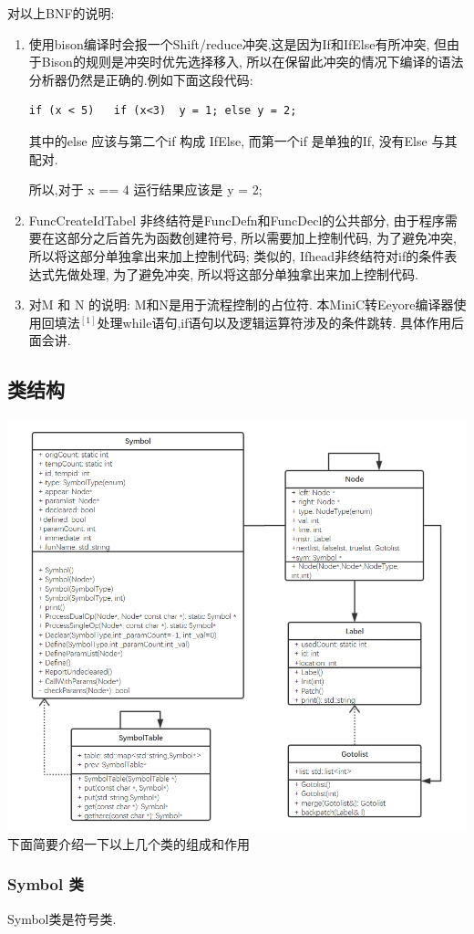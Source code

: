 \documentclass[UTF8]{article}
\begin{document}
对以上BNF的说明:
\begin{enumerate}[(1)]
\item 使用bison编译时会报一个Shift/reduce冲突,这是因为If和IfElse有所冲突, 但由于Bison的规则是冲突时优先选择移入, 所以在保留此冲突的情况下编译的语法分析器仍然是正确的.例如下面这段代码:
\begin{lstlisting}
if (x < 5)   if (x<3)  y = 1; else y = 2; 
\end{lstlisting}
其中的else 应该与第二个if 构成 IfElse, 而第一个if 是单独的If, 没有Else 与其配对.

所以,对于 x == 4 运行结果应该是 y = 2;
\item FuncCreateIdTabel 非终结符是FuncDefn和FuncDecl的公共部分, 由于程序需要在这部分之后首先为函数创建符号, 所以需要加上控制代码, 为了避免冲突, 所以将这部分单独拿出来加上控制代码; 类似的, Ifhead非终结符对if的条件表达式先做处理, 为了避免冲突, 所以将这部分单独拿出来加上控制代码.
\item 对M 和 N 的说明: M和N是用于流程控制的占位符. 本MiniC转Eeyore编译器使用回填法$^{[1]}$处理while语句,if语句以及逻辑运算符涉及的条件跳转. 具体作用后面会讲.
\end{enumerate}
\subsection{类结构}
\includegraphics[width=\linewidth]{uml_eeyore} 
下面简要介绍一下以上几个类的组成和作用
\subsubsection{Symbol 类}
Symbol类是符号类.
\end{document}
